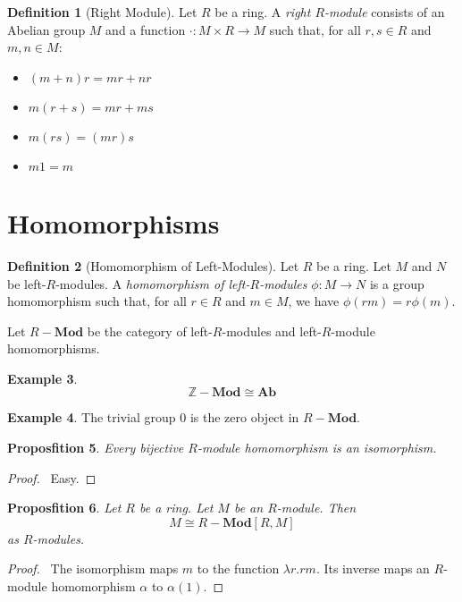 \documentclass{book}
\let\qed\relax
\newtheorem{prop}{Proposfition}[chapter]
\theoremstyle{definition}
\newtheorem{df}[prop]{Definition}
\newtheorem{ex}[prop]{Example}
\newcommand{\Ab}{\ensuremath{\mathbf{Ab}}}
\newcommand{\Mod}[1]{\ensuremath{{#1}-\mathbf{Mod}}}
\begin{document}
\begin{df}[Right Module]
Let $R$ be a ring. A \emph{right $R$-module} consists of an Abelian group $M$ and a function $\cdot : M \times R \rightarrow M$ such that, for all $r,s \in R$ and $m,n \in M$:
\begin{itemize}
\item $(m+n)r = mr + nr$
\item $m(r+s) = mr + ms$
\item $m(rs) = (mr)s$
\item $m1 = m$
\end{itemize}
\end{df}

\section{Homomorphisms}

\begin{df}[Homomorphism of Left-Modules]
Let $R$ be a ring. Let $M$ and $N$ be left-$R$-modules. A \emph{homomorphism of left-$R$-modules} $\phi : M \rightarrow N$ is a group homomorphism such that, for all $r \in R$ and $m \in M$, we have $\phi(rm) = r\phi(m)$.

Let $\Mod{R}$ be the category of left-$R$-modules and left-$R$-module homomorphisms.
\end{df}

\begin{ex}
\[ \Mod{\mathbb{Z}} \cong \Ab \]
\end{ex}

\begin{ex}
The trivial group $0$ is the zero object in $\Mod{R}$.
\end{ex}

\begin{prop}
Every bijective $R$-module homomorphism is an isomorphism.
\end{prop}

\begin{proof}
\pf\ Easy. \qed
\end{proof}

\begin{prop}
Let $R$ be a ring. Let $M$ be an $R$-module. Then
\[ M \cong \Mod{R}[R,M] \]
as $R$-modules.
\end{prop}

\begin{proof}
\pf\ The isomorphism maps $m$ to the function $\lambda r.rm$. Its inverse maps an $R$-module homomorphism $\alpha$ to $\alpha(1)$. \qed
\end{proof}
\end{document}
